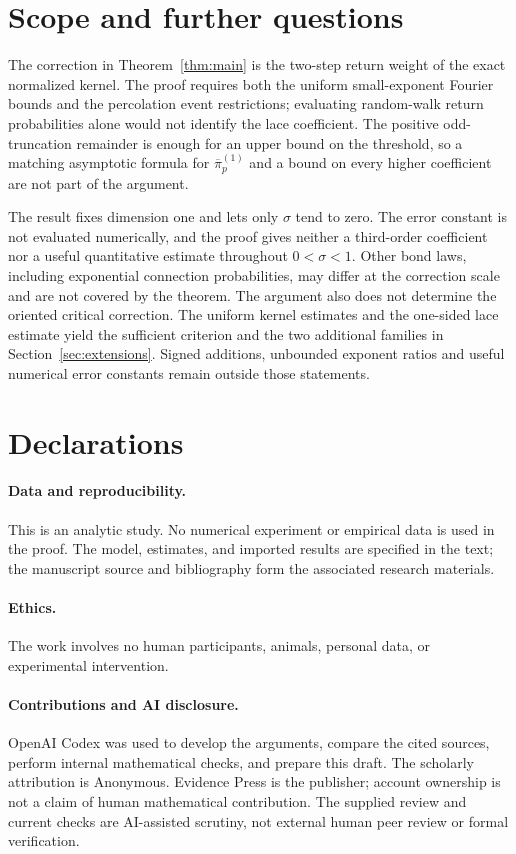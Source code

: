 \documentclass[11pt]{article}
\theoremstyle{definition}
\begin{document}
\section{Scope and further questions}

The correction in Theorem~\ref{thm:main} is the two-step return weight
of the exact normalized kernel. The proof requires both the uniform
small-exponent Fourier bounds and the percolation event restrictions;
evaluating random-walk return probabilities alone would not identify
the lace coefficient. The positive odd-truncation remainder is enough
for an upper bound on the threshold, so a matching asymptotic formula
for $\overline\pi_p^{(1)}$ and a bound on every higher coefficient are
not part of the argument.

The result fixes dimension one and lets only $\sigma$ tend to zero.
The error constant is not evaluated numerically, and the proof gives
neither a third-order coefficient nor a useful quantitative estimate
throughout $0<\sigma<1$. Other bond laws, including exponential
connection probabilities, may differ at the correction scale and are
not covered by the theorem. The argument also does not determine the
oriented critical correction. The uniform kernel estimates and the
one-sided lace estimate yield the sufficient criterion and the two additional
families in Section~\ref{sec:extensions}. Signed additions, unbounded exponent
ratios and useful numerical error constants remain outside those statements.

\section*{Declarations}

\paragraph{Data and reproducibility.}
This is an analytic study. No numerical experiment or empirical data
is used in the proof. The model, estimates, and imported results are
specified in the text; the manuscript source and bibliography form
the associated research materials.

\paragraph{Ethics.}
The work involves no human participants, animals, personal data, or
experimental intervention.

\paragraph{Contributions and AI disclosure.}
OpenAI Codex was used to develop the arguments, compare the cited
sources, perform internal mathematical checks, and prepare this draft.
The scholarly attribution is Anonymous. Evidence Press is the publisher;
account ownership is not a claim of human mathematical contribution.
The supplied review and current checks are AI-assisted scrutiny, not external
human peer review or formal verification.
\end{document}
